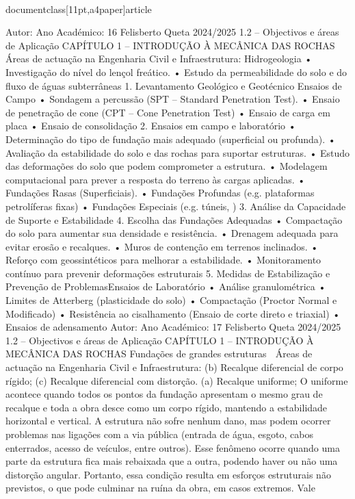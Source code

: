 \\documentclass[11pt,a4paper]{article}
\begin{document}
Autor:
Ano Académico:
16
Felisberto Queta
2024/2025
1.2 – Objectivos e áreas de Aplicação
CAPÍTULO 1 
–
 INTRODUÇÃO À MECÂNICA DAS ROCHAS
 Áreas de actuação na Engenharia Civil e Infraestrutura:
Hidrogeologia
• Investigação do nível do lençol freático.
• Estudo da permeabilidade do solo e do fluxo de águas 
subterrâneas
1. Levantamento Geológico e Geotécnico
Ensaios de Campo
• Sondagem a percussão (SPT – Standard Penetration Test).
• Ensaio de penetração de cone (CPT – Cone Penetration
Test)
• Ensaio de carga em placa
• Ensaio de consolidação
2. Ensaios em campo e laboratório
• Determinação do tipo de fundação mais adequado (superficial ou 
profunda).
• Avaliação da estabilidade do solo e das rochas para suportar 
estruturas.
• Estudo das deformações do solo que podem comprometer a 
estrutura.
• Modelagem computacional para prever a resposta do terreno às 
cargas aplicadas.
• Fundações Rasas (Superficiais).
• Fundações Profundas (e.g. plataformas petrolíferas fixas)
• Fundações Especiais (e.g. túneis, )
3. Análise da Capacidade de Suporte e Estabilidade
4. Escolha das Fundações Adequadas
• Compactação do solo para aumentar sua densidade e 
resistência.
• Drenagem adequada para evitar erosão e recalques.
• Muros de contenção em terrenos inclinados.
• Reforço com geossintéticos para melhorar a estabilidade.
• Monitoramento contínuo para prevenir deformações estruturais
5. Medidas de Estabilização e Prevenção de ProblemasEnsaios de Laboratório
• Análise granulométrica
• Limites de Atterberg (plasticidade do solo)
• Compactação (Proctor Normal e Modificado)
• Resistência ao cisalhamento (Ensaio de corte direto e 
triaxial)
• Ensaios de adensamento
Autor:
Ano Académico:
17
Felisberto Queta
2024/2025
1.2 – Objectivos e áreas de Aplicação
CAPÍTULO 1 
–
 INTRODUÇÃO À MECÂNICA DAS ROCHAS
Fundações de grandes estruturas
 Áreas de actuação na Engenharia Civil e Infraestrutura:
(b) Recalque diferencial de 
corpo rígido; 
(c) Recalque diferencial com 
distorção. (a) Recalque uniforme; 
O uniforme acontece quando todos os 
pontos da fundação apresentam o mesmo 
grau de recalque e toda a obra desce como 
um corpo rígido, mantendo a estabilidade 
horizontal e vertical. A estrutura não sofre 
nenhum dano, mas podem ocorrer problemas 
nas ligações com a via pública (entrada de 
água, esgoto, cabos enterrados, acesso de 
veículos, entre outros).
Esse fenômeno ocorre quando uma 
parte da estrutura fica mais rebaixada 
que a outra, podendo haver ou não uma 
distorção angular. Portanto, essa 
condição resulta em esforços estruturais 
não previstos, o que pode culminar na 
ruína da obra, em casos extremos. Vale 
\end{document}
